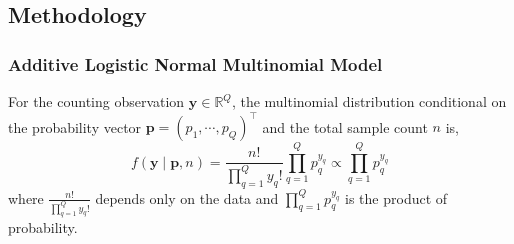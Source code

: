 \documentclass[]{report}
\theoremstyle{definition}
\begin{document}
\subsection{Methodology}
\subsubsection{Additive Logistic Normal Multinomial Model}
For the counting observation $\boldsymbol{y}\in \mathbb{R}^{Q}$, the multinomial distribution conditional on the probability vector $\boldsymbol{p}=(p_{1},\cdots ,p_{Q})^{\top}$ and the total sample count $n$ is,
\begin{equation}
f(\boldsymbol{y}\mid \boldsymbol{p},n)=\dfrac{n!}{\prod_{q=1}^{Q}y_{q}!}\prod_{q=1}^{Q}p_{q}^{y_{q}} \propto  \prod_{q=1}^{Q}p_{q}^{y_{q}}
\end{equation}
where $\frac{n!}{\prod_{q=1}^{Q}y_{q}!}$ depends only on the data and $\prod_{q=1}^{Q}p_{q}^{y_{q}}$ is the product of probability. 
\end{document}
